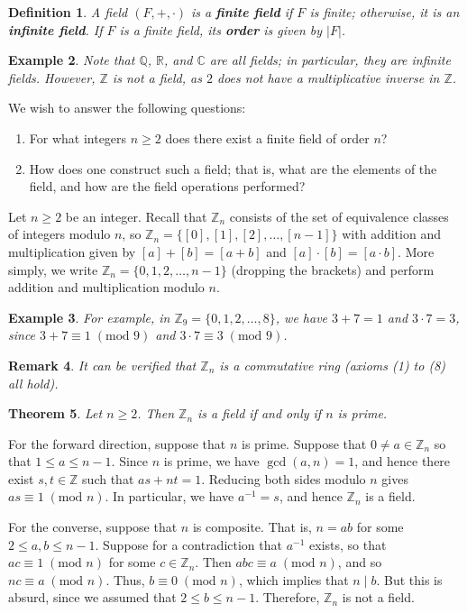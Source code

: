 \documentclass[10pt]{article}
\makeatletter
\newcommand{\R}{\mathbb{R}}
\newcommand{\C}{\mathbb{C}}
\newcommand{\Z}{\mathbb{Z}}
\newcommand{\Q}{\mathbb{Q}}
\theoremstyle{newstyle}
\newtheorem{thm}{Theorem}[subsection]
\newtheorem{remark}[thm]{Remark}
\newtheorem{defn}[thm]{Definition}
\newtheorem{exmp}[thm]{Example}
\newenvironment{pf}[1][\proofname]{\par
  \pushQED{\qed}%
  \normalfont \topsep0\p@\relax
  \trivlist
  \item[\hskip\labelsep\scshape
  #1\@addpunct{.}]\ignorespaces
}{%
  \popQED\endtrivlist\@endpefalse
}
\makeatother
\begin{document}
\begin{defn}
A field $(F, +, \cdot)$ is a {\bf finite field} if $F$ is finite; otherwise, it is an 
{\bf infinite field}. If $F$ is a finite field, its {\bf order} is given by $|F|$.
\end{defn}

\begin{exmp}
Note that $\Q$, $\R$, and $\C$ are all fields; in particular, they are infinite fields. 
However, $\Z$ is not a field, as $2$ does not have a multiplicative inverse in $\Z$.
\end{exmp}

We wish to answer the following questions:
\begin{enumerate}[(1)]
    \item For what integers $n \geq 2$ does there exist a finite field of order $n$?
    \item How does one construct such a field; that is, what are the elements of the field, 
    and how are the field operations performed?
\end{enumerate}

Let $n \geq 2$ be an integer. Recall that $\Z_n$ consists of the set of equivalence classes of integers 
modulo $n$, so $\Z_n = \{[0], [1], [2], \dots, [n-1]\}$ with addition and multiplication 
given by $[a] + [b] = [a+b]$ and $[a] \cdot [b] = [a \cdot b]$. More simply, we write 
$\Z_n = \{0, 1, 2, \dots, n-1\}$ (dropping the brackets) and perform addition and multiplication 
modulo $n$.

\begin{exmp}
For example, in $\Z_9 = \{0, 1, 2, \dots, 8\}$, we have $3+7=1$ and $3 \cdot 7 = 3$, since 
$3 + 7 \equiv 1 \; (\text{mod } 9)$ and $3 \cdot 7 \equiv 3 \; (\text{mod } 9)$.
\end{exmp}

\begin{remark}
It can be verified that $\Z_n$ is a commutative ring (axioms (1) to (8) all hold).
\end{remark}

\begin{thm}
Let $n \geq 2$. Then $\Z_n$ is a field if and only if $n$ is prime.
\end{thm}
\begin{pf}
For the forward direction, suppose that $n$ is prime. Suppose that $0 \neq a \in \Z_n$ so that 
$1 \leq a \leq n-1$. Since $n$ is prime, we have $\gcd(a, n) = 1$, and hence there 
exist $s, t \in \Z$ such that $as + nt = 1$. Reducing both sides modulo $n$ gives 
$as \equiv 1 \; (\text{mod } n)$. In particular, we have $a^{-1} = s$, and hence $\Z_n$ is a field. 

For the converse, suppose that $n$ is composite. That is, $n = ab$ for some $2 \leq a, b \leq n-1$. 
Suppose for a contradiction that $a^{-1}$ exists, so that $ac \equiv 1 \; (\text{mod } n)$ for 
some $c \in \Z_n$. Then $abc \equiv a \; (\text{mod } n)$, and so $nc \equiv a \; (\text{mod } n)$. 
Thus, $b \equiv 0 \; (\text{mod } n)$, which implies that $n \mid b$. But this is absurd, 
since we assumed that $2 \leq b \leq n-1$. Therefore, $\Z_n$ is not a field.
\end{pf}
\end{document}
